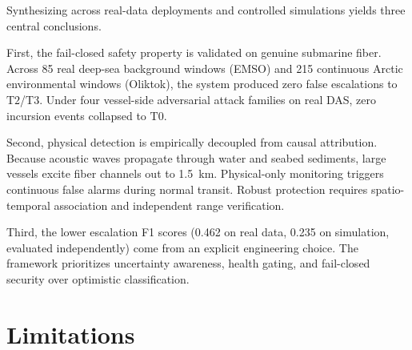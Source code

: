 \documentclass[conference]{IEEEtran}
\newcommand{\dstate}[1]{\ensuremath{\mathrm{#1}}}
\begin{document}
Synthesizing across real-data deployments and controlled simulations yields
three central conclusions.

First, the fail-closed safety property is validated on genuine submarine fiber.
Across 85 real deep-sea background windows (EMSO) and 215 continuous Arctic
environmental windows (Oliktok), the system produced zero false escalations to
\dstate{T2}/\dstate{T3}. Under four vessel-side adversarial attack families on
real DAS, zero incursion events collapsed to \dstate{T0}.

Second, physical detection is empirically decoupled from causal attribution.
Because acoustic waves propagate through water and seabed sediments, large
vessels excite fiber channels out to 1.5~km. Physical-only monitoring triggers
continuous false alarms during normal transit. Robust protection requires
spatio-temporal association and independent range verification.

Third, the lower escalation F1 scores (0.462 on real data, 0.235 on simulation,
evaluated independently) come from an explicit engineering choice. The
framework prioritizes uncertainty awareness, health gating, and fail-closed
security over optimistic classification.

\section{Limitations}
\label{sec:limitations}
\end{document}
